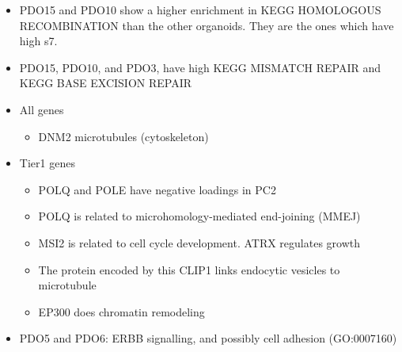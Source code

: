 \documentclass{article}
\begin{document}
\begin{itemize}
\item PDO15 and PDO10 show a higher enrichment in KEGG HOMOLOGOUS RECOMBINATION than the other organoids. They are the ones which have high s7.
\item PDO15, PDO10, and PDO3, have high KEGG MISMATCH REPAIR and KEGG BASE EXCISION REPAIR
\item All genes
\begin{itemize}
\item DNM2 microtubules (cytoskeleton)
\end{itemize}
\item Tier1 genes
\begin{itemize}
\item POLQ and POLE have negative loadings in PC2
\item POLQ is related to microhomology-mediated end-joining (MMEJ)
\item MSI2 is related to cell cycle development. ATRX regulates growth
\item The protein encoded by this CLIP1 links endocytic vesicles to microtubule
\item EP300 does chromatin remodeling 
\end{itemize}
\item PDO5 and PDO6: ERBB signalling, and possibly cell adhesion (GO:0007160)
\end{itemize}
\end{document}
